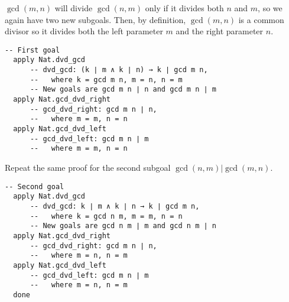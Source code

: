 
$\gcd (m,n)$ will divide $\gcd (n,m)$ only if it divides both $n$ and $m$, so we again have two new subgoals. Then, by definition, $\gcd (m,n)$ is a common divisor so it divides both the left parameter $m$ and the right parameter $n$. 

\begin{Verbatim}[firstnumber=last]
  -- First goal
  apply Nat.dvd_gcd
      -- dvd_gcd: (k ∣ m ∧ k ∣ n) → k ∣ gcd m n,
      --   where k = gcd m n, m = n, n = m
      -- New goals are gcd m n ∣ n and gcd m n ∣ m
  apply Nat.gcd_dvd_right
      -- gcd_dvd_right: gcd m n ∣ n,
      --   where m = m, n = n
  apply Nat.gcd_dvd_left
      -- gcd_dvd_left: gcd m n ∣ m
      --   where m = m, n = n
\end{Verbatim}

\pagebreak[3]

Repeat the same proof for the second subgoal $\gcd (n,m) | \gcd (m,n)$.

\begin{Verbatim}[firstnumber=last]
  -- Second goal
  apply Nat.dvd_gcd
      -- dvd_gcd: k ∣ m ∧ k ∣ n → k ∣ gcd m n,
      --   where k = gcd n m, m = m, n = n
      -- New goals are gcd n m ∣ m and gcd n m ∣ n
  apply Nat.gcd_dvd_right
      -- gcd_dvd_right: gcd m n ∣ n,
      --   where m = n, n = m
  apply Nat.gcd_dvd_left
      -- gcd_dvd_left: gcd m n ∣ m
      --   where m = n, n = m
  done
\end{Verbatim}


